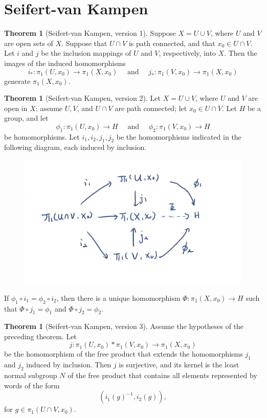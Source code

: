\documentclass[12pt,a4paper]{book}
\theoremstyle{definition}
\newtheorem{theo}[defn]{Theorem}
\begin{document}
\section{Seifert-van Kampen}
\begin{theo}[Seifert-van Kampen, version 1]
    Suppose $X=U \cup V$, where $U$ and $V$ are open sets of $X$. Suppose that $U \cap V$ is path connected, and that $x_0 \in U \cap V$. Let $i$ and $j$ be the inclusion mappings of $U$ and $V$, respectively, into $X$. Then the images of the induced homomorphisms
    $$
        i_*: \pi_1\left(U, x_0\right) \rightarrow \pi_1\left(X, x_0\right) \quad \text { and } \quad j_*: \pi_1\left(V, x_0\right) \rightarrow \pi_1\left(X, x_0\right)
    $$
    generate $\pi_1\left(X, x_0\right)$.
    \label{theorem:Seifert-van Kampen,version 1}
\end{theo}
\begin{theo}[Seifert-van Kampen, version 2]
    Let $X=U \cup V$, where $U$ and $V$ are open in $X$; assume $U, V$, and $U \cap V$ are path connected; let $x_0 \in U \cap V$. Let $H$ be a group, and let
    $$
        \phi_1: \pi_1\left(U, x_0\right) \longrightarrow H \quad \text { and } \quad \phi_2: \pi_1\left(V, x_0\right) \longrightarrow H
    $$
    be homomorphisms. Let $i_1, i_2, j_1, j_2$ be the homomorphisms indicated in the following diagram, each induced by inclusion.
    \begin{figure}[H]
        \includegraphics[scale=0.5]{vankampen.png}
        \centering
    \end{figure}
    If $\phi_1 \circ i_1=\phi_2 \circ i_2$, then there is a unique homomorphism $\Phi: \pi_1\left(X, x_0\right) \rightarrow H$ such that $\Phi \circ j_1=\phi_1$ and $\Phi \circ j_2=\phi_2$.
    \label{theorem:Seifert-van Kampen,version 2}
\end{theo}
\begin{theo}[Seifert-van Kampen, version 3]
    Assume the hypotheses of the preceding theorem. Let
    $$
        j: \pi_1\left(U, x_0\right) * \pi_1\left(V, x_0\right) \longrightarrow \pi_1\left(X, x_0\right)
    $$
    be the homomorphism of the free product that extends the homomorphisms $j_1$ and $j_2$ induced by inclusion. Then $j$ is surjective, and its kernel is the least normal subgroup $N$ of the free product that contains all elements represented by words of the form
    $$
        \left(i_1(g)^{-1}, i_2(g)\right),
    $$
    for $g \in \pi_1\left(U \cap V, x_0\right)$.
    \label{theorem:Seifert-van Kampen,version 3}
\end{theo}
\end{document}
